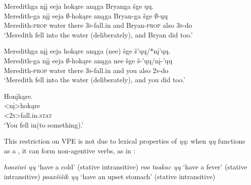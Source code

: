 \documentclass[output=paper]{LSP/langsci}
\begin{document}
 
\ea\label{ex:johnson:21}
\ea\label{ex:johnson:21a} 
\glll Meredithga nįį eeja hokąre anąga Bryanga šge ųų.\\
Meredith-ga nįį eeja $\emptyset$-hokąre anąga Bryan-ga šge $\emptyset$-ųų\\
Meredith-\textsc{prop} water there \textsc{3s}-fall.in and Bryan-\textsc{prop} also \textsc{3s}-do\\
\trans `Meredith fell into the water (deliberately), and Bryan did too.'
 
\ex\label{ex:johnson:21b} 
\glll Meredithga nįį eeja hokąre anąga (nee) šge š'ųų/*nį'ųų.\\
Meredith-ga nįį eeja $\emptyset$-hokąre anąga nee šge š-'ųų/nį-'ųų\\
Meredith-\textsc{prop} water there \textsc{3s}-fall.in and you also \textsc{2s}-do\\
\trans `Meredith fell into the water (deliberately), and you did too.'
\z
\z
 
\ea\label{ex:johnson:22} 
\glll Honįkąre.\\
<nį>hokąre\\
<\textsc{2s}>fall.in.\textsc{stat}\\
\trans `You fell in(to something).' \citep{Hartmann2012}
\z
	
This restriction on VPE is not due to lexical properties of \emph{ųų}: when \emph{ųų} functions as a , it can form non-agentive verbs, as in :

 
\ea\label{ex:johnson:23}
\ea 
\textit{hooxiwi ųų} `have a cold' (stative intransitive)
\vspace{12pt}
\ex 
\textit{roo taakac ųų} `have a fever' (stative intransitive)
\vspace{12pt}
\ex 
\textit{paaxšišik ųų} `have an upset stomach' (stative intransitive)\\
\citep{Hartmann2012}
\z
\z
\end{document}
